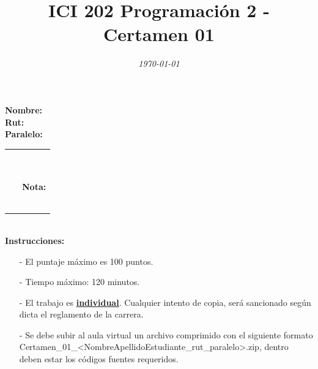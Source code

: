 \documentclass{exam}
\title{\LARGE\color{azul}\textbf{ICI 202 Programaci\'on 2 - Certamen 01 }}
\author{\normalsize \color{gray}{Prof.} \color{black}{\textbf{Ismael Figueroa, Eduardo Godoy}}}
\date{\normalsize \em \today}
\begin{document}

\maketitle

\begin{multicols}{2} \begin{flushleft} \textbf{Nombre:} \\ \vspace*{2mm} \textbf{Rut:} \\ \vspace*{2mm} \textbf{Paralelo:} \end{flushleft} \begin{center} \begin{table}[H] \begin{tabular}{p{4cm}|p{3cm}|} \arrayrulecolor{gray!50}\cline{2-2} ~ & {\em {\scriptsize \color{gray!50}{Puntaje:}}} \\ & ~ \\ ~ & \textbf{Nota:} \\ & ~ \\ \arrayrulecolor{gray!50}\cline{2-2} \end{tabular} \end{table} \end{center} \end{multicols}

\vspace*{-18mm}
\noindent
\textbf{\\Instrucciones:}
\begin{itemize}
    \item[-] El puntaje m\'aximo  es 100 puntos.
    \item[-] Tiempo m\'aximo: 120 minutos.
    \item[-] El trabajo es \underline{\textbf{individual}}. Cualquier intento de copia, ser\'a sancionado seg\'un dicta el reglamento de la carrera.
    \item[-] Se debe subir al aula virtual un archivo comprimido con el siguiente formato \\ {Certamen_01\_<NombreApellidoEstudiante\_rut\_paralelo>.zip, dentro deben estar los c\'odigos fuentes requeridos.}
\end{itemize}
\end{document}
